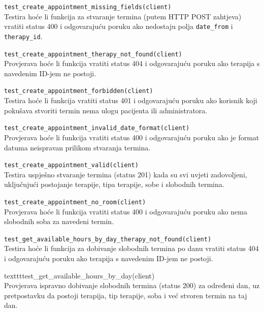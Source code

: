 			
	\begin{packed_item}
		\item \texttt{test\_create\_appointment\_missing\_fields(client)} \\
Testira hoće li funkcija za stvaranje termina (putem HTTP POST zahtjeva) vratiti status 400 i odgovarajuću poruku ako nedostaju polja \texttt{date\_from} i \texttt{therapy\_id}.
		\item \texttt{test\_create\_appointment\_therapy\_not\_found(client)} \\
		Provjerava hoće li funkcija vratiti status 404 i odgovarajuću poruku ako terapija s navedenim ID-jem ne postoji.
        \item \texttt{test\_create\_appointment\_forbidden(client)} \\
        Testira hoće li funkcija vratiti status 401 i odgovarajuću poruku ako korisnik koji pokušava stvoriti termin nema ulogu pacijenta ili administratora.
        \item \texttt{test\_create\_appointment\_invalid\_date\_format(client)} \\
        Provjerava hoće li funkcija vratiti status 400 i odgovarajuću poruku ako je format datuma neispravan prilikom stvaranja termina.
        \item \texttt{test\_create\_appointment\_valid(client)} \\
        Testira uspješno stvaranje termina (status 201) kada su svi uvjeti zadovoljeni, uključujući postojanje terapije, tipa terapije, sobe i slobodnih termina.	
        \item \texttt{test\_create\_appointment\_no\_room(client)}	\\
        	Provjerava hoće li funkcija vratiti status 400 i odgovarajuću poruku ako nema slobodnih soba za navedeni termin.
        \item \texttt{test\_get\_available\_hours\_by\_day\_therapy\_not\_found(client)} \\
        Testira hoće li funkcija za dobivanje slobodnih termina po danu vratiti status 404 i odgovarajuću poruku ako terapija s navedenim ID-jem ne postoji.
        \item texttt{test\_get\_available\_hours\_by\_day(client)} \\
        Provjerava ispravno dobivanje slobodnih termina (status 200) za određeni dan, uz pretpostavku da postoji terapija, tip terapije, soba i već stvoren termin na taj dan.
                   				
	 \end{packed_item}
	 
